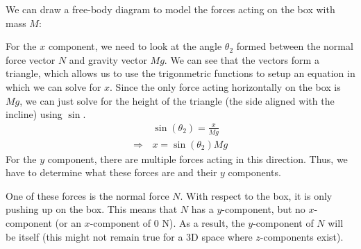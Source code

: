 \documentclass{article}
\begin{document}
\noindent We can draw a free-body diagram to model the forces acting on the box with mass $M$:
\begin{figure}[H]
    \centering
\end{figure}

For the $x$ component, we need to look at the angle $\theta_2$ formed between the 
normal force vector $N$ and gravity vector $Mg$. We can see 
that the vectors form a triangle, which allows us to use the trigonmetric functions 
to setup an equation in which we can solve for $x$.
Since the only force acting horizontally on the box is $Mg$, 
we can just solve for the height of the triangle (the side aligned with the incline) using 
$\sin$.
\begin{align*}
    &\sin(\theta_2) = \frac{x}{Mg} \\ 
    \Rightarrow \, &\boxed{x = \sin(\theta_2)Mg}
\end{align*}
For the $y$ component, there are multiple forces acting in this direction. Thus, we have to 
determine what these forces are and their $y$ components. 

One of these forces is the normal force $N$. With respect to the box, it is only
pushing up on the box. This means that $N$ has a $y$-component, but no $x$-component (or an $x$-component of 0 N).
As a result, the $y$-component of $N$ will be itself (this might not remain true for a 3D space where 
$z$-components exist). 
\end{document}
